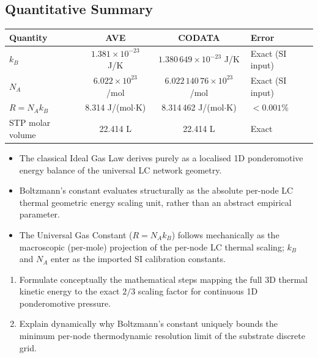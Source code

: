 \subsection*{Quantitative Summary}
\begin{center}
\small
\renewcommand{\arraystretch}{1.2}
\begin{tabularx}{\textwidth}{@{}lccX@{}}
\toprule
\textbf{Quantity} & \textbf{AVE} & \textbf{CODATA} & \textbf{Error} \\
\midrule
$k_B$              & $1.381 \times 10^{-23}$ J/K & $1.380\,649 \times 10^{-23}$ J/K & Exact (SI input) \\
$N_A$              & $6.022 \times 10^{23}$ /mol & $6.022\,140\,76 \times 10^{23}$ /mol & Exact (SI input) \\
$R = N_A k_B$      & 8.314 J/(mol$\cdot$K) & 8.314\,462 J/(mol$\cdot$K) & $< 0.001\%$ \\
STP molar volume    & 22.414 L & 22.414 L & Exact \\
\bottomrule
\end{tabularx}
\end{center}

\begin{summarybox}
\begin{itemize}
    \item The classical Ideal Gas Law derives purely as a localised 1D ponderomotive energy balance of the universal LC network geometry.
    \item Boltzmann's constant evaluates structurally as the absolute per-node LC thermal geometric energy scaling unit, rather than an abstract empirical parameter.
    \item The Universal Gas Constant ($R = N_A k_B$) follows mechanically as the macroscopic (per-mole) projection of the per-node LC thermal scaling; $k_B$ and $N_A$ enter as the imported SI calibration constants.
\end{itemize}
\end{summarybox}

\begin{exercisebox}
\begin{enumerate}
    \item Formulate conceptually the mathematical steps mapping the full 3D thermal kinetic energy to the exact $2/3$ scaling factor for continuous 1D ponderomotive pressure.
    \item Explain dynamically why Boltzmann's constant uniquely bounds the minimum per-node thermodynamic resolution limit of the substrate discrete grid.
\end{enumerate}
\end{exercisebox}
